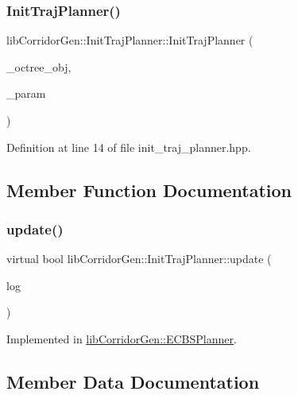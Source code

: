 \subsubsection{\texorpdfstring{Init\+Traj\+Planner()}{InitTrajPlanner()}}
{\footnotesize\ttfamily lib\+Corridor\+Gen\+::\+Init\+Traj\+Planner\+::\+Init\+Traj\+Planner (\begin{DoxyParamCaption}\item[{std\+::shared\+\_\+ptr$<$ octomap\+::\+Oc\+Tree $>$}]{\+\_\+octree\+\_\+obj,  }\item[{\hyperlink{classlib_corridor_gen_1_1_param}{Param}}]{\+\_\+param }\end{DoxyParamCaption})\hspace{0.3cm}{\ttfamily [inline]}}



Definition at line 14 of file init\+\_\+traj\+\_\+planner.\+hpp.



\subsection{Member Function Documentation}
\mbox{\label{classlib_corridor_gen_1_1_init_traj_planner_acfc10a68eddb236a10790c4d92473d99}} 
\subsubsection{\texorpdfstring{update()}{update()}}
{\footnotesize\ttfamily virtual bool lib\+Corridor\+Gen\+::\+Init\+Traj\+Planner\+::update (\begin{DoxyParamCaption}\item[{bool}]{log }\end{DoxyParamCaption})\hspace{0.3cm}{\ttfamily [pure virtual]}}



Implemented in \hyperlink{classlib_corridor_gen_1_1_e_c_b_s_planner_a0d4c5855c02228c677b3d2d89c10740c}{lib\+Corridor\+Gen\+::\+E\+C\+B\+S\+Planner}.



\subsection{Member Data Documentation}
\mbox{\label{classlib_corridor_gen_1_1_init_traj_planner_a3575a01c82d6d07c08de34219455ef5d}} 
